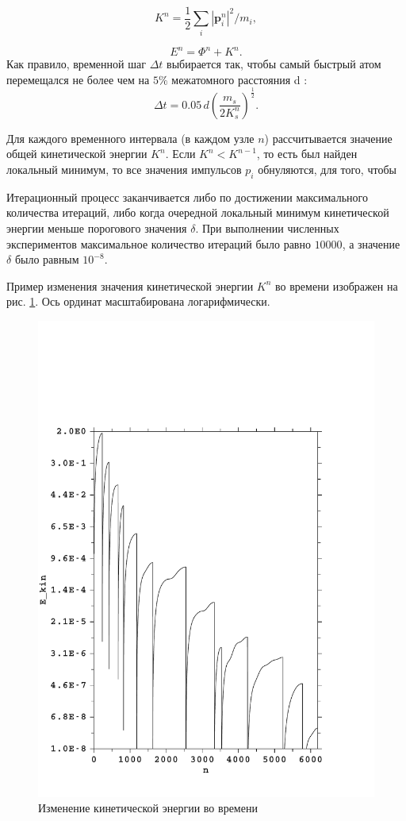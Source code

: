 \begin{equation}
\label{LF4}
K^n = \dfrac{1}{2} \sum_{i} |\mathbf{p}^{n}_i|^2/m_i,
\end{equation}

\begin{equation}
\label{LF5}
E^n = {\Phi}^n + K^n .
\end{equation}
Как правило, временной шаг $\Delta t$ выбирается так, чтобы самый быстрый атом перемещался не более чем на $5\%$ межатомного расстояния d \cite{Eckstein}:
\begin{equation}
\label{LF6}
\Delta t = 0.05 \, d \left( \dfrac{m_s}{2 K_s^n} \right)^{\frac{1}{2}}.
\end{equation}

Для каждого временного интервала (в каждом узле $n$) рассчитывается значение общей кинетической энергии $K^n$.
Если $K^n < K^{n-1}$, то есть был найден локальный минимум, %
то все значения импульсов $p_{i}$ обнуляются, для того, чтобы %

Итерационный процесс заканчивается либо по достижении максимального количества итераций,
либо когда очередной локальный минимум кинетической энергии меньше порогового значения $\delta$.
При выполнении численных экспериментов максимальное количество итераций было равно $10000$,
а значение $\delta$ было равным $10^{-8}$.

Пример изменения значения кинетической энергии $K^n$ во времени изображен на рис. \ref{kinet_energy_MD}.
Ось ординат масштабирована логарифмически.

\begin{figure}[h!]
\centering
  \includegraphics[width=1.0\textwidth]{./FIGs/Kin_energy_MD.pdf}
\caption{Изменение кинетической энергии во времени}
\label{kinet_energy_MD}
\end{figure}

